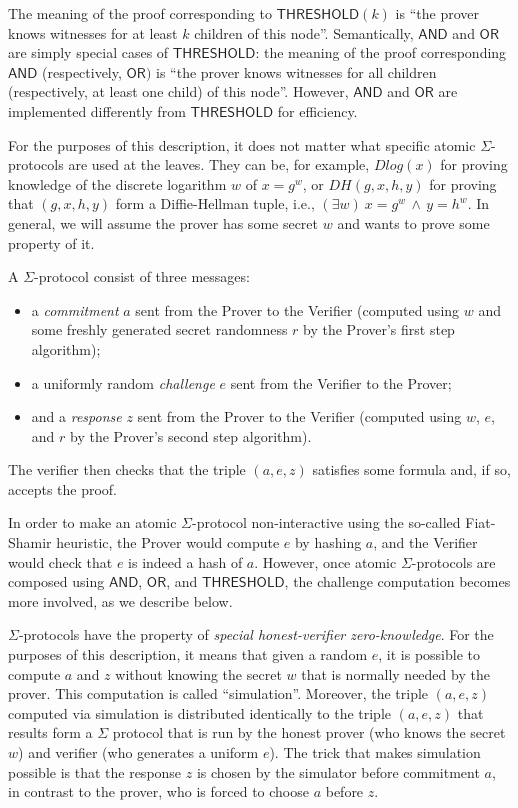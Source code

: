 \documentclass[11pt]{article}
\newcommand{\andnode}{\ensuremath{\mathsf{AND}}}
\newcommand{\ornode}{\ensuremath{\mathsf{OR}}}
\newcommand{\tnode}{\ensuremath{\mathsf{THRESHOLD}}}
\begin{document}
The meaning of the proof corresponding to $\tnode(k)$ is ``the prover knows witnesses for at least $k$ children of this node''. Semantically, $\andnode$ and $\ornode$ are simply special cases of $\tnode$: the meaning  of the proof corresponding $\andnode$ (respectively, $\ornode)$ is ``the prover knows witnesses for all children (respectively, at least one child) of this node''. However, $\andnode$ and $\ornode$ are implemented differently from $\tnode$ for efficiency.

For the purposes of this description, it does not matter what specific atomic $\Sigma$-protocols are used at the leaves. They can be, for example, $Dlog(x)$ for proving knowledge of the discrete logarithm $w$ of $x=g^w$, or $DH(g, x, h, y)$ for proving that $(g, x, h, y)$ form a Diffie-Hellman tuple, i.e., $(\exists w) \ x = g^w \, \wedge \, y = h^w$. In general, we will assume the prover has some secret $w$ and wants to prove some property of it. 

A $\Sigma$-protocol consist of three messages: 

\begin{itemize}
\item a \emph{commitment} $a$ sent from the Prover to the Verifier (computed using $w$ and some freshly generated secret randomness $r$ by the Prover's first step algorithm);
\item a uniformly random \emph{challenge} $e$ sent from the Verifier to the Prover;
\item and a \emph{response} $z$ sent from the Prover to the Verifier (computed using $w$, $e$, and $r$ by the Prover's second step algorithm). 
\end{itemize}
The verifier then checks that the triple $(a, e, z)$ satisfies some formula and, if so, accepts the proof.

In order to make an atomic $\Sigma$-protocol non-interactive using the so-called Fiat-Shamir heuristic, the Prover would compute $e$ by hashing $a$, and the Verifier would check that $e$ is indeed a hash of $a$. However, once atomic $\Sigma$-protocols are composed using $\andnode$, $\ornode$, and $\tnode$, the challenge computation becomes more involved, as we describe below.

$\Sigma$-protocols have the property of \emph{special honest-verifier zero-knowledge}. For the purposes of this description, it means that given a random $e$, it is possible to compute $a$ and $z$ without knowing the secret $w$ that is normally needed by the prover. This computation is called ``simulation''. Moreover, the triple $(a, e, z)$  computed via simulation is distributed identically to the triple $(a, e, z)$ that results form a $\Sigma$ protocol that is run by the honest prover (who knows the secret $w$) and verifier (who generates a uniform $e$). The trick that makes simulation possible is that the response $z$ is chosen by the simulator before commitment $a$, in contrast to the prover, who is forced to choose $a$ before $z$.
\end{document}
